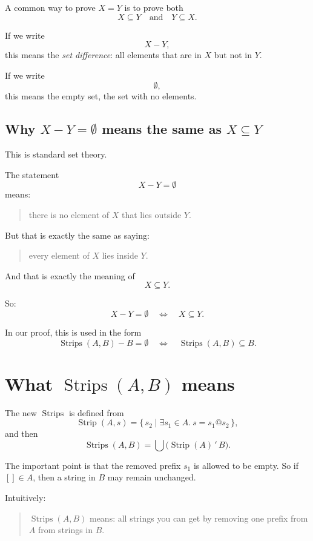 \documentclass[11pt]{article}
\begin{document}
A common way to prove \(X=Y\) is to prove both
\[
X \subseteq Y
\quad\text{and}\quad
Y \subseteq X.
\]

If we write
\[
X - Y,
\]
this means the \emph{set difference}: all elements that are in \(X\) but not in \(Y\).

If we write
\[
\emptyset,
\]
this means the empty set, the set with no elements.

\subsection*{Why \(X-Y=\emptyset\) means the same as \(X \subseteq Y\)}

This is standard set theory.

The statement
\[
X-Y=\emptyset
\]
means:

\begin{quote}
there is no element of \(X\) that lies outside \(Y\).
\end{quote}

But that is exactly the same as saying:

\begin{quote}
every element of \(X\) lies inside \(Y\).
\end{quote}

And that is exactly the meaning of
\[
X \subseteq Y.
\]

So:
\[
X-Y=\emptyset
\quad\Longleftrightarrow\quad
X \subseteq Y.
\]

In our proof, this is used in the form
\[
\operatorname{Strips}(A,B)-B=\emptyset
\quad\Longleftrightarrow\quad
\operatorname{Strips}(A,B)\subseteq B.
\]

\section*{What \(\operatorname{Strips}(A,B)\) means}

The new \(\operatorname{Strips}\) is defined from
\[
\operatorname{Strip}(A,s)=\{\,s_2 \mid \exists s_1\in A.\ s=s_1@s_2\,\},
\]
and then
\[
\operatorname{Strips}(A,B)=\bigcup\bigl(\operatorname{Strip}(A)\,'\,B\bigr).
\]

The important point is that the removed prefix \(s_1\) is allowed to be empty. So if \([] \in A\), then a string in \(B\) may remain unchanged.

Intuitively:

\begin{quote}
\(\operatorname{Strips}(A,B)\) means: all strings you can get by removing one prefix from \(A\) from strings in \(B\).
\end{quote}
\end{document}
